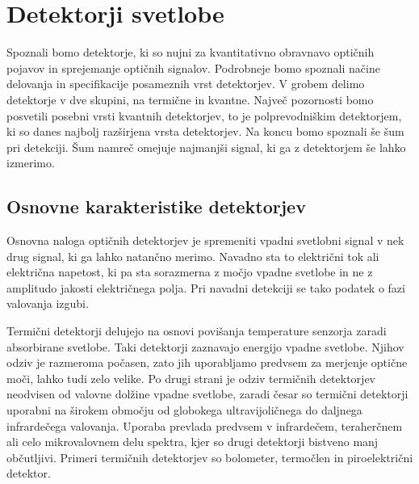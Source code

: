 
\chapter{Detektorji svetlobe}

Spoznali bomo detektorje, ki so nujni za kvantitativno obravnavo
optičnih pojavov in sprejemanje optičnih signalov. Podrobneje bomo spoznali
načine delovanja in specifikacije posameznih vrst detektorjev.
V grobem delimo detektorje v dve skupini, na termične in 
kvantne. Največ pozornosti bomo posvetili posebni vrsti kvantnih 
detektorjev, to je polprevodniškim detektorjem, ki so danes najbolj razširjena vrsta detektorjev.
Na koncu bomo spoznali še šum pri detekciji. Šum namreč omejuje najmanjši 
signal, ki ga z detektorjem še lahko izmerimo.

\section{Osnovne karakteristike detektorjev}
Osnovna naloga optičnih detektorjev je spremeniti vpadni svetlobni signal 
v nek drug signal, ki ga lahko natančno merimo. Navadno sta to električni tok 
ali električna napetost, ki pa sta sorazmerna z močjo vpadne svetlobe 
in ne z amplitudo jakosti električnega polja. Pri navadni detekciji se tako
podatek o fazi valovanja izgubi. 

Termični detektorji delujejo na osnovi povišanja temperature senzorja 
zaradi absorbirane svetlobe. Taki detektorji zaznavajo energijo 
vpadne svetlobe. Njihov odziv je razmeroma počasen, zato jih uporabljamo
predvsem za merjenje optične moči, lahko tudi zelo velike. 
Po drugi strani je odziv termičnih detektorjev neodvisen
od valovne dolžine vpadne svetlobe, zaradi česar so termični detektorji uporabni na 
širokem območju od globokega ultravijoličnega do daljnega infrardečega valovanja. 
Uporaba
prevlada predvsem v infrardečem, teraherčnem ali celo mikrovalovnem delu spektra, kjer so 
drugi detektorji bistveno manj občutljivi. 
Primeri termičnih detektorjev so bolometer, termočlen in piroelektrični detektor.

